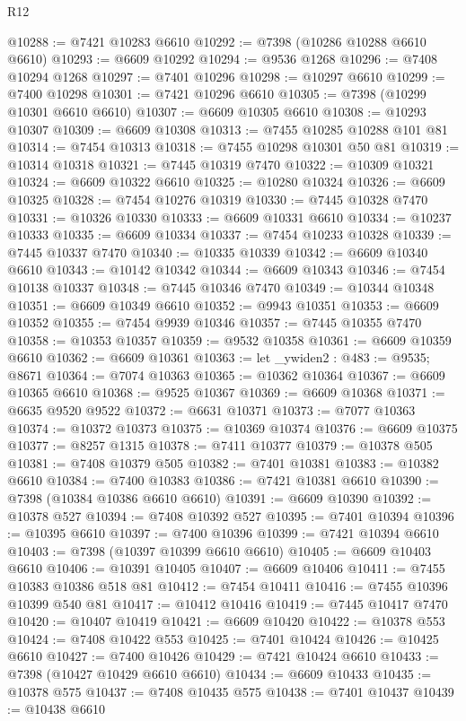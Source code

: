 \begin{lexlean}{R12}
\begin{coremodule}
@10288 := @7421 @10283 @6610
@10292 := @7398 (@10286 @10288 @6610 @6610)
@10293 := @6609 @10292
@10294 := @9536 @1268
@10296 := @7408 @10294 @1268
@10297 := @7401 @10296
@10298 := @10297 @6610
@10299 := @7400 @10298
@10301 := @7421 @10296 @6610
@10305 := @7398 (@10299 @10301 @6610 @6610)
@10307 := @6609 @10305 @6610
@10308 := @10293 @10307
@10309 := @6609 @10308
@10313 := @7455 @10285 @10288 @101 @81
@10314 := @7454 @10313
@10318 := @7455 @10298 @10301 @50 @81
@10319 := @10314 @10318
@10321 := @7445 @10319 @7470
@10322 := @10309 @10321
@10324 := @6609 @10322 @6610
@10325 := @10280 @10324
@10326 := @6609 @10325
@10328 := @7454 @10276 @10319
@10330 := @7445 @10328 @7470
@10331 := @10326 @10330
@10333 := @6609 @10331 @6610
@10334 := @10237 @10333
@10335 := @6609 @10334
@10337 := @7454 @10233 @10328
@10339 := @7445 @10337 @7470
@10340 := @10335 @10339
@10342 := @6609 @10340 @6610
@10343 := @10142 @10342
@10344 := @6609 @10343
@10346 := @7454 @10138 @10337
@10348 := @7445 @10346 @7470
@10349 := @10344 @10348
@10351 := @6609 @10349 @6610
@10352 := @9943 @10351
@10353 := @6609 @10352
@10355 := @7454 @9939 @10346
@10357 := @7445 @10355 @7470
@10358 := @10353 @10357
@10359 := @9532 @10358
@10361 := @6609 @10359 @6610
@10362 := @6609 @10361
@10363 := let _ywiden2 : @483 := @9535; @8671
@10364 := @7074 @10363
@10365 := @10362 @10364
@10367 := @6609 @10365 @6610
@10368 := @9525 @10367
@10369 := @6609 @10368
@10371 := @6635 @9520 @9522
@10372 := @6631 @10371
@10373 := @7077 @10363
@10374 := @10372 @10373
@10375 := @10369 @10374
@10376 := @6609 @10375
@10377 := @8257 @1315
@10378 := @7411 @10377
@10379 := @10378 @505
@10381 := @7408 @10379 @505
@10382 := @7401 @10381
@10383 := @10382 @6610
@10384 := @7400 @10383
@10386 := @7421 @10381 @6610
@10390 := @7398 (@10384 @10386 @6610 @6610)
@10391 := @6609 @10390
@10392 := @10378 @527
@10394 := @7408 @10392 @527
@10395 := @7401 @10394
@10396 := @10395 @6610
@10397 := @7400 @10396
@10399 := @7421 @10394 @6610
@10403 := @7398 (@10397 @10399 @6610 @6610)
@10405 := @6609 @10403 @6610
@10406 := @10391 @10405
@10407 := @6609 @10406
@10411 := @7455 @10383 @10386 @518 @81
@10412 := @7454 @10411
@10416 := @7455 @10396 @10399 @540 @81
@10417 := @10412 @10416
@10419 := @7445 @10417 @7470
@10420 := @10407 @10419
@10421 := @6609 @10420
@10422 := @10378 @553
@10424 := @7408 @10422 @553
@10425 := @7401 @10424
@10426 := @10425 @6610
@10427 := @7400 @10426
@10429 := @7421 @10424 @6610
@10433 := @7398 (@10427 @10429 @6610 @6610)
@10434 := @6609 @10433
@10435 := @10378 @575
@10437 := @7408 @10435 @575
@10438 := @7401 @10437
@10439 := @10438 @6610

\end{coremodule}
\end{lexlean}
